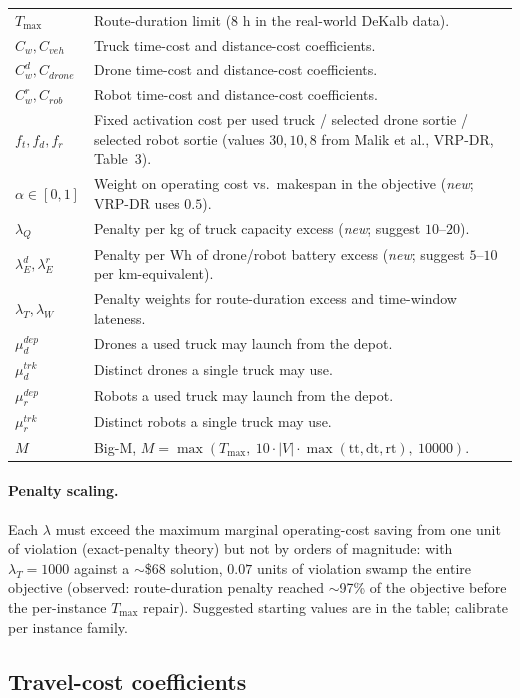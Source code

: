 \documentclass[10pt]{article}
\begin{document}
{\begin{longtable}{@{}p{}p{}@{}}
$T_{\max}$ & Route-duration limit (8 h in the real-world DeKalb data). \\
$C_w, C_{veh}$ & Truck time-cost and distance-cost coefficients. \\
$C^d_w, C_{drone}$ & Drone time-cost and distance-cost coefficients. \\
$C^r_w, C_{rob}$ & Robot time-cost and distance-cost coefficients. \\
$f_t, f_d, f_r$ & Fixed activation cost per used truck / selected drone sortie / selected robot sortie (values $30, 10, 8$ from Malik et al., VRP-DR, Table~3). \\
$\alpha\in[0,1]$ & Weight on operating cost vs.\ makespan in the objective (\emph{new}; VRP-DR uses $0.5$). \\
$\lambda_Q$ & Penalty per kg of truck capacity excess (\emph{new}; suggest $10$--$20$). \\
$\lambda^d_E, \lambda^r_E$ & Penalty per Wh of drone/robot battery excess (\emph{new}; suggest $5$--$10$ per km-equivalent). \\
$\lambda_T, \lambda_W$ & Penalty weights for route-duration excess and time-window lateness. \\
$\mu^{dep}_d$ & Drones a used truck may launch from the depot. \\
$\mu^{trk}_d$ & Distinct drones a single truck may use. \\
$\mu^{dep}_r$ & Robots a used truck may launch from the depot. \\
$\mu^{trk}_r$ & Distinct robots a single truck may use. \\
$M$ & Big-M, $M = \max(T_{\max},\ 10\cdot|V|\cdot\max(\mathrm{tt},\mathrm{dt},\mathrm{rt}),\ 10000)$. \\
\bottomrule
\end{longtable}
}

\paragraph{Penalty scaling.} Each $\lambda$ must exceed the maximum marginal
operating-cost saving from one unit of violation (exact-penalty theory) but not
by orders of magnitude: with $\lambda_T = 1000$ against a $\sim$\$68 solution,
$0.07$ units of violation swamp the entire objective (observed: route-duration
penalty reached $\sim$97\% of the objective before the per-instance $T_{\max}$
repair). Suggested starting values are in the table; calibrate per instance
family.

\subsection{Travel-cost coefficients}
\end{document}
